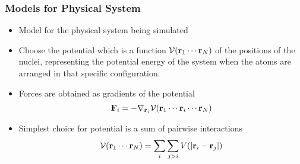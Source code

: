 \documentclass[slidestop,mathserif,compress,xcolor=svgnames]{beamer}
\newenvironment{bblock}[0]
{
\begin{beamerboxesrounded}[upper=uppercol1,lower=lowercol1,shadow=true]}
{\end{beamerboxesrounded}}
\begin{document}
\begin{frame}
\begin{columns}
\begin{bblock}{}
{
      }
    \end{bblock}
  \end{columns}
\end{frame}

\begin{frame}
  \frametitle{\small Models for Physical System}
  \begin{bblock}{}
    \begin{itemize}
    \item Model for the physical system being simulated
    \item Choose the potential which is a function $\mathcal{V}({\bf r}_1\cdots{\bf r}_N)$ of the positions of the nuclei, representing the potential energy of the system when the atoms are arranged in that specific configuration.
    \item Forces are obtained as gradients of the potential
      \begin{align*}
        {\bf F}_i = -\nabla_{{\bf r}_i}\mathcal{V}({\bf r}_1\cdots{\bf r}_i\cdots{\bf r}_N)
      \end{align*}
    \item Simplest choice for potential is a sum of pairwise interactions
      \begin{align*}
        \mathcal{V}({\bf r}_1\cdots{\bf r}_N) = \sum_i\sum_{j>i} V(|{\bf r}_i - {\bf r}_j|)
      \end{align*}
    \end{itemize}
  \end{bblock}
\end{frame}
\end{document}
